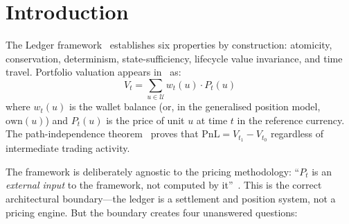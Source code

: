 \documentclass[11pt,a4paper]{article}
\begin{document}
\begin{abstract}
Version~0.2 adds a new section on \emph{consistency with the lifecycle engine}.  The valuation stack and the lifecycle engine both depend on and modify the same state: the price function depends on unit state ($P_t(u) = P(u, \mathrm{state}_t(u), \mathrm{market\_data}_t)$), lifecycle events create price discontinuities that invalidate the Taylor approximation, and the ordering between lifecycle processing and valuation cycles is load-bearing.  The new section formalises the lifecycle-valuation ordering protocol, defines when lifecycle events trigger immediate repricing versus staleness marking, extends the Pricing DAG with state-dependency edges, and provides two worked examples---a bond coupon payment and an SBL fee accrual---that trace the complete sequence from lifecycle event through Taylor invalidation, reprice, PnL explain, and publication.

The document is self-contained and independently readable.  It references the Ledger specification and the PnL explain paper by citation, not by import.
\end{abstract}

\tableofcontents
\clearpage

\section{Introduction}
\label{sec:intro}

The Ledger framework~\cite{ledger} establishes six properties by construction: atomicity, conservation, determinism, state-sufficiency, lifecycle value invariance, and time travel.  Portfolio valuation appears in~\cite[\S4]{ledger} as:
\[
V_t = \sum_{u \in \mathcal{U}} w_t(u) \cdot P_t(u)
\]
where $w_t(u)$ is the wallet balance (or, in the generalised position model, $\mathrm{own}(u)$) and $P_t(u)$ is the price of unit $u$ at time $t$ in the reference currency.  The path-independence theorem~\cite[\S4.3]{ledger} proves that $\mathrm{PnL} = V_{t_1} - V_{t_0}$ regardless of intermediate trading activity.

The framework is deliberately agnostic to the pricing methodology: ``$P_t$ is an \emph{external input} to the framework, not computed by it''~\cite[\S4.1]{ledger}.  This is the correct architectural boundary---the ledger is a settlement and position system, not a pricing engine.  But the boundary creates four unanswered questions:
\end{document}
